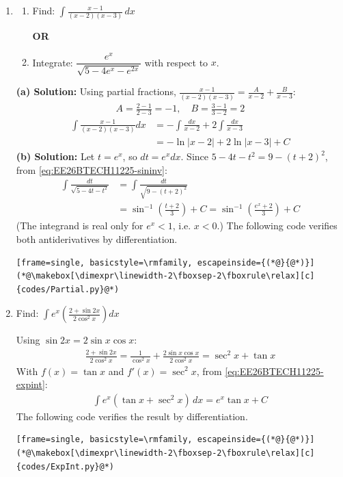 \begin{enumerate}[label=\thesubsection.\arabic*, ref=\thesubsection.\theenumi]
    \item
    \begin{enumerate}[label=(\alph*), leftmargin=1.5em, labelsep=0.5em]
        \item Find: $\displaystyle\int\frac{x-1}{(x-2)(x-3)}\,dx$

        \begin{center}
            \textbf{OR}
        \end{center}

        \item Integrate: $\dfrac{e^x}{\sqrt{5-4e^x-e^{2x}}}$ with respect to $x$.
    \end{enumerate} \vspace{2pt}
    \textbf{(a) Solution:} Using partial fractions, $\frac{x-1}{(x-2)(x-3)} = \frac{A}{x-2}+\frac{B}{x-3}$:
\begin{align}
    A = \frac{2-1}{2-3} = -1, \quad B = \frac{3-1}{3-2} = 2
\end{align}
\begin{align}
    \int\frac{x-1}{(x-2)(x-3)}dx &= -\int\frac{dx}{x-2} + 2\int\frac{dx}{x-3} \\
    &= -\ln|x-2| + 2\ln|x-3| + C
\end{align}
\textbf{(b) Solution:} Let $t = e^x$, so $dt = e^x dx$. Since $5-4t-t^2 = 9-(t+2)^2$, from \eqref{eq:EE26BTECH11225-sininv}:
\begin{align}
    \int\frac{dt}{\sqrt{5-4t-t^2}} &= \int\frac{dt}{\sqrt{9-(t+2)^2}} \\
    &= \sin^{-1}\left(\frac{t+2}{3}\right) + C = \sin^{-1}\left(\frac{e^x+2}{3}\right) + C
\end{align}
(The integrand is real only for $e^x<1$, i.e. $x<0$.) The following code verifies both antiderivatives by differentiation.
\begin{lstlisting}[frame=single, basicstyle=\rmfamily, escapeinside={(*@}{@*)}]
(*@\makebox[\dimexpr\linewidth-2\fboxsep-2\fboxrule\relax][c]{codes/Partial.py}@*)
\end{lstlisting}

    \item Find: $\displaystyle\int e^x\left(\frac{2+\sin 2x}{2\cos^2 x}\right)dx$

\solution Using $\sin 2x = 2\sin x\cos x$:
\begin{align}
    \frac{2+\sin 2x}{2\cos^2 x} = \frac{1}{\cos^2 x} + \frac{2\sin x\cos x}{2\cos^2 x} = \sec^2 x + \tan x
\end{align}
With $f(x) = \tan x$ and $f'(x) = \sec^2 x$, from \eqref{eq:EE26BTECH11225-expint}:
\begin{align}
    \int e^x(\tan x+\sec^2 x)\,dx = e^x\tan x + C
\end{align}
The following code verifies the result by differentiation.
\begin{lstlisting}[frame=single, basicstyle=\rmfamily, escapeinside={(*@}{@*)}]
(*@\makebox[\dimexpr\linewidth-2\fboxsep-2\fboxrule\relax][c]{codes/ExpInt.py}@*)
\end{lstlisting}


\end{enumerate}
